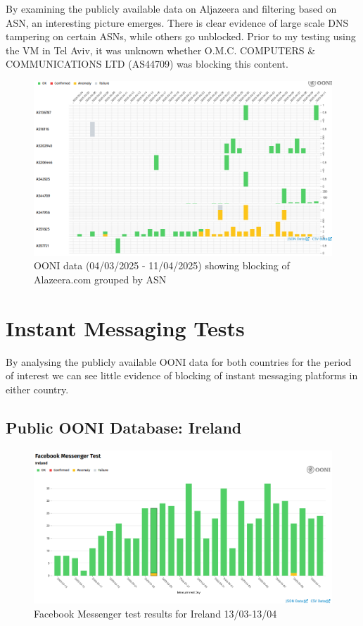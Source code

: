By examining the publicly available data on Aljazeera and filtering based on ASN, an interesting picture emerges. There is clear evidence of large scale DNS tampering on certain ASNs, while others go unblocked. Prior to my testing using the VM in Tel Aviv, it was unknown whether O.M.C. COMPUTERS \& COMMUNICATIONS LTD (AS44709) was blocking this content. 

\begin{figure} [H]
    \centering
    \includegraphics[width=1\linewidth]{ALJZRbyASN.png}
    \caption{OONI data (04/03/2025 - 11/04/2025) showing blocking of Alazeera.com grouped by ASN}
    \label{fig:enter-label}
\end{figure}



\section{Instant Messaging Tests}
By analysing the publicly available OONI data for both countries for the period of interest we can see little evidence of blocking of instant messaging platforms in either country.

\subsection{Public OONI Database: Ireland}
\begin{figure} [H]
    \centering
    \includegraphics[width=0.5\linewidth]{IREOONIDBIMFB.png}
    \caption{Facebook Messenger test results for Ireland 13/03-13/04}
    \label{fig:enter-label}
\end{figure}

